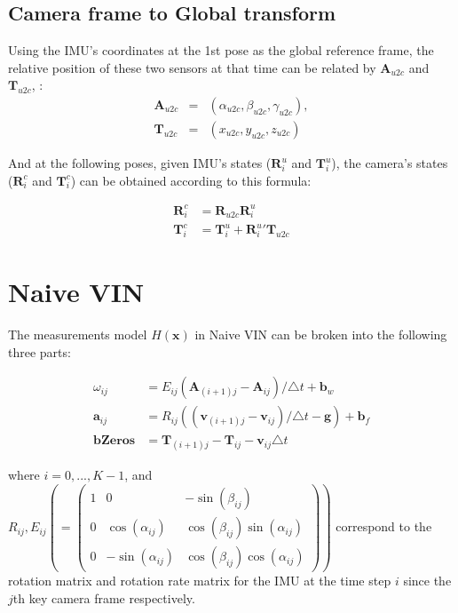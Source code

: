 \documentclass[12pt]{article}   %
\begin{document}
\begin{appendices}
	\subsection{Camera frame to Global transform}	
Using the IMU's coordinates at the 1st pose as the global reference frame, the relative position of these two sensors at that time can be related by $\textbf{A}_{u2c}$ and $\textbf{T}_{u2c}$, : 
\begin{eqnarray*}   %
	\textbf{A}_{u2c} & = & (\alpha_{u2c}, \beta_{u2c}, \gamma_{u2c}), \\
	\textbf{T}_{u2c} & = & (x_{u2c}, y_{u2c}, z_{u2c})
\end{eqnarray*}

And at the following poses, given IMU's states ($\textbf{R}^u_i$ and $\textbf{T}^u_i$), the camera's states ($\textbf{R}^c_i$ and $\textbf{T}^c_i$) can be obtained according to this formula:

\begin{align*}
\textbf{R}^c_i &= \textbf{R}_{u2c} \textbf{R}^u_i \\
\textbf{T}^c_i &= \textbf{T}^u_i + {\textbf{R}^u_i}'  \textbf{T}_{u2c}  
\end{align*} 
	

\section{Naive VIN}
The measurements model $H(\textbf{x})$ in Naive VIN can be broken into the following three parts:

\begin{align}
\omega_{ij} &= E_{ij} (\textbf{A}_{(i+1)j} - \textbf{A}_{ij})/\triangle t + \textbf{b}_w \\
\textbf{a}_{ij} &= R_{ij} ((\textbf{v}_{(i+1)j} - \textbf{v}_{ij}) / \triangle t - \textbf{g}) + \textbf{b}_f \\
\textbf{bZeros} &= \textbf{T}_{(i+1)j} - \textbf{T}_{ij} - \textbf{v}_{ij} \triangle t
\end{align}

where $i = 0,..., K-1$, and $R_{ij}, E_{ij} ( = \begin{pmatrix} 1 & 0 & -\sin(\beta_{ij}) \\ 0 & \cos(\alpha_{ij}) & \cos(\beta_{ij})\sin(\alpha_{ij}) \\ 0 & -\sin(\alpha_{ij}) & \cos(\beta_{ij})\cos(\alpha_{ij}) \end{pmatrix}) $ correspond to the rotation matrix and rotation rate matrix for the IMU at the time step $i$ since the $j$th key camera frame respectively.


\end{appendices}
\end{document}
